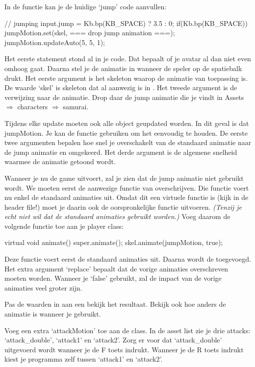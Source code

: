In de functie  kan je de huidige `jump' code aanvullen:

\begin{code}
// jumping
input.jump = Kb.bp(KB_SPACE) ?  3.5 :  0;
if(Kb.bp(KB_SPACE))
{
  jumpMotion.set(skel, === drop jump animation ===);
}
jumpMotion.updateAuto(5, 5, 1);
\end{code}

Het eerste statement stond al in je code. Dat bepaalt of je avatar al dan niet even omhoog gaat. Daarna stel je de animatie in wanneer de speler op de spatiebalk drukt. Het eerste argument is het skeleton waarop de animatie van toepassing is. De waarde `skel' is skeleton dat al aanwezig is in . Het tweede argument is de verwijzing naar de animatie. Drop daar de jump animatie die je vindt in Assets $\Rightarrow$ characters $\Rightarrow$ samurai.

Tijdens elke update moeten ook alle  object geupdated worden. In dit geval is dat jumpMotion. Je kan de  functie gebruiken om het eenvoudig te houden. De eerste twee argumenten bepalen hoe snel je overschakelt van de standaard animatie naar de jump animatie en omgekeerd. Het derde argument is de algemene snelheid waarmee de animatie getoond wordt.

Wanneer je nu de game uitvoert, zal je zien dat de jump animatie niet gebruikt wordt. We moeten eerst de aanwezige functie  van  overschrijven. Die functie voert nu enkel de standaard animaties uit. Omdat dit een virtuele functie is (kijk in de header file!) moet je daarin ook de oorspronkelijke functie uitvoeren. \textit{(Tenzij je echt niet wil dat de standaard animaties gebruikt worden.)} Voeg daarom de volgende functie toe aan je player class:

\begin{code}
virtual void animate()
{
  super.animate();
  skel.animate(jumpMotion, true);
}
\end{code}

Deze functie voert eerst de standaard animaties uit. Daarna wordt de  toegevoegd. Het extra argument `replace' bepaalt dat de vorige animaties overschreven moeten worden. Wanneer je `false' gebruikt, zal de impact van de vorige animaties veel groter zijn.

\begin{exercise}
Pas de waarden in  aan een bekijk het resultaat. Bekijk ook hoe anders de animatie is wanneer je  gebruikt.

Voeg een extra  `attackMotion' toe aan de  class. In de asset list zie je drie attacks: `attack\_double', `attack1' en `attack2'. Zorg er voor dat `attack\_double' uitgevoerd wordt wanneer je de F toets indrukt. Wanneer je de R toets indrukt kiest je programma zelf tussen `attack1' en `attack2'.
\end{exercise}


